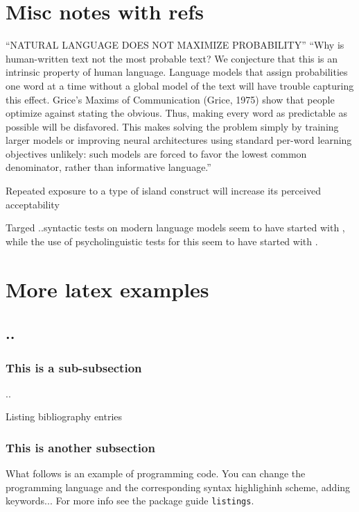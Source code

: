 \section{Misc notes with refs}

“NATURAL LANGUAGE DOES NOT MAXIMIZE PROBABILITY” 
“Why is human-written text not the most probable text? We conjecture that this is an intrinsic property of human language. Language models that assign probabilities one word at a time without a global model of the text will have trouble capturing this effect. Grice’s Maxims of Communication (Grice, 1975) show that people optimize against stating the obvious. Thus, making every word as predictable as possible will be disfavored. This makes solving the problem simply by training larger models or improving neural architectures using standard per-word learning objectives unlikely: such models are forced to favor the lowest common denominator, rather than informative language.” 
\citep{holtzman2019curious}

Repeated exposure to a type of island construct will increase its perceived acceptability 
\citep{chaves2014subject}

Targed ..syntactic tests on modern language models seem to have started with \citet{linzen2016assessing}, while the use of psycholinguistic tests for this seem to have started with \citet{futrell2018rnns}.

\clearpage
\section{More latex examples}
\subsection{..}
\subsubsection{This is a sub-subsection}
..


Listing bibliography entries \citep{wei2021frequency, hu2020systematic, lau2020furiously, sprouse2016experimental, bostrom2020byte, futrell-etal-2019-neural}

\subsubsection{This is another subsection}

What follows is an example of programming code. You can change the programming language and the corresponding syntax highlighinh scheme, adding keywords... For more info see the package guide \texttt{listings}.

 
